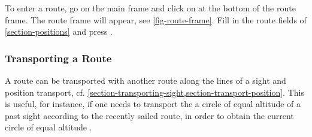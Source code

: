 \documentclass{ol-softwaremanual}
\begin{document}
To enter a route, go on the main frame and click on  at the bottom of the route frame. The route frame will appear, see \cref{fig-route-frame}. Fill in the route fields of \cref{section-positions} and press . 

\subsubsection{Transporting a Route}\label{section-transporting-route}

A route can be transported with another route along the lines of a sight and position transport, cf. \cref{section-transporting-sight,section-transport-position}. This is useful, for instance, if one needs to transport the a  circle of equal altitude of a past sight according to the recently sailed route, in order to obtain the current circle of equal altitude \cite{bowditch2002the}. 



\pagebreak
\printacronyms[pages={display=all,seq/use=false}]


\end{document}

